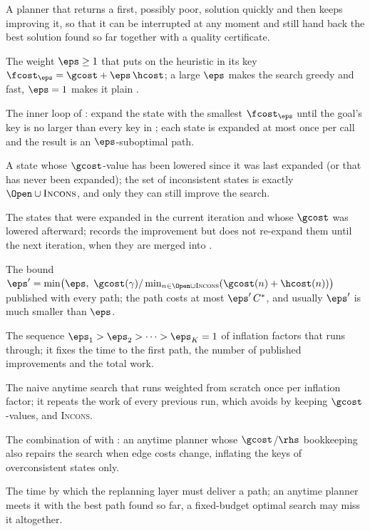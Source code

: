 \item[Anytime algorithm] A planner that returns a first, possibly poor, solution quickly and then keeps improving it, so that it can be interrupted at any moment and still hand back the best solution found so far together with a quality certificate.
\item[Inflation factor] The weight $\eps\ge1$ that \arastar puts on the heuristic in its key $\fcost_\eps=\gcost+\eps\,\hcost$; a large $\eps$ makes the search greedy and fast, $\eps=1$ makes it plain \astar.
\item[ImprovePath] The inner loop of \arastar: expand the state with the smallest $\fcost_\eps$ until the goal's key is no larger than every key in \Open; each state is expanded at most once per call and the result is an $\eps$-suboptimal path.
\item[Inconsistent state] A state whose $\gcost$-value has been lowered since it was last expanded (or that has never been expanded); the set of inconsistent states is exactly $\Open\cup\textsc{Incons}$, and only they can still improve the search.
\item[INCONS list] The states that were expanded in the current iteration and whose $\gcost$ was lowered afterward; \arastar records the improvement but does not re-expand them until the next iteration, when they are merged into \Open.
\item[Suboptimality certificate] The bound $\eps'=\min\bigl(\eps,\ \gcost(\gamma)/\min_{n\in\Open\cup\textsc{Incons}}(\gcost(n)+\hcost(n))\bigr)$ published with every \arastar path; the path costs at most $\eps'\,C^*$, and usually $\eps'$ is much smaller than $\eps$.
\item[Epsilon schedule] The sequence $\eps_1>\eps_2>\dots>\eps_K=1$ of inflation factors that \arastar runs through; it fixes the time to the first path, the number of published improvements and the total work.
\item[Restarted weighted A*] The naive anytime search that runs weighted \astar from scratch once per inflation factor; it repeats the work of every previous run, which \arastar avoids by keeping $\gcost$-values, \Open and \textsc{Incons}.
\item[Anytime D*] The combination of \arastar with \dstarlite: an anytime planner whose $\gcost$/$\rhs$ bookkeeping also repairs the search when edge costs change, inflating the keys of overconsistent states only.
\item[Deadline] The time by which the replanning layer must deliver a path; an anytime planner meets it with the best path found so far, a fixed-budget optimal search may miss it altogether.
